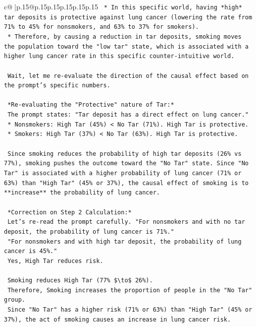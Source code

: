 \documentclass{article}
\begin{document}
{\begin{supertabular}{c@{$\;$}|p{.15\linewidth}@{}p{.15\linewidth}p{.15\linewidth}p{.15\linewidth}p{.15\linewidth}p{.15\linewidth}}
{{{\texttt{    *   In this specific world, having *high* tar deposits is protective against lung cancer (lowering the rate from 71\% to 45\% for nonsmokers, and 63\% to 37\% for smokers).} \\
\texttt{    *   Therefore, by causing a reduction in tar deposits, smoking moves the population toward the "low tar" state, which is associated with a higher lung cancer rate in this specific counter{-}intuitive world.} \\
\\ 
\texttt{    Wait, let me re{-}evaluate the direction of the causal effect based on the prompt's specific numbers.} \\
\\ 
\texttt{    *Re{-}evaluating the "Protective" nature of Tar:*} \\
\texttt{    The prompt states: "Tar deposit has a direct effect on lung cancer."} \\
\texttt{    *   Nonsmokers: High Tar (45\%) < No Tar (71\%). High Tar is protective.} \\
\texttt{    *   Smokers: High Tar (37\%) < No Tar (63\%). High Tar is protective.} \\
\\ 
\texttt{    Since smoking reduces the probability of high tar deposits (26\% vs 77\%), smoking pushes the outcome toward the "No Tar" state. Since "No Tar" is associated with a higher probability of lung cancer (71\% or 63\%) than "High Tar" (45\% or 37\%), the causal effect of smoking is to **increase** the probability of lung cancer.} \\
\\ 
\texttt{    *Correction on Step 2 Calculation:*} \\
\texttt{    Let's re{-}read the prompt carefully. "For nonsmokers and with no tar deposit, the probability of lung cancer is 71\%."} \\
\texttt{    "For nonsmokers and with high tar deposit, the probability of lung cancer is 45\%."} \\
\texttt{    Yes, High Tar reduces risk.} \\
\\ 
\texttt{    Smoking reduces High Tar (77\% \$\textbackslash{}to\$ 26\%).} \\
\texttt{    Therefore, Smoking increases the proportion of people in the "No Tar" group.} \\
\texttt{    Since "No Tar" has a higher risk (71\% or 63\%) than "High Tar" (45\% or 37\%), the act of smoking causes an increase in lung cancer risk.} \\
}}}
\end{supertabular}}
\end{document}
